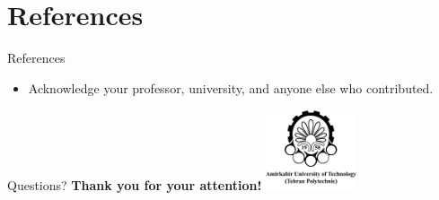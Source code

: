 \documentclass{beamer}
\begin{document}
\section{References}
\begin{frame}{References}
    \begin{itemize}
        \item Acknowledge your professor, university, and anyone else who contributed.
    \end{itemize}
\end{frame}

\begin{frame}{Questions?}
    \centering
    {\Large \textbf{Thank you for your attention!}} \vspace{1cm} %
    \vfill %
    \includegraphics[width=0.2\textwidth]{amirkabir.png} %
\end{frame}
\end{document}
